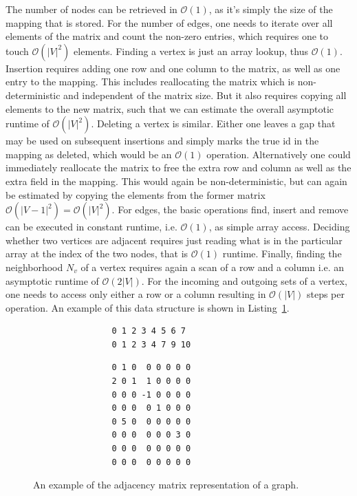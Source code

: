             The number of nodes can be retrieved in $\mathcal{O}(1)$, as it's simply the size of the mapping that is stored.
            For the number of edges, one needs to iterate over all elements of the matrix and count the non-zero entries, which requires one to touch $\mathcal{O}(|V|^2)$ elements.
            Finding a vertex is just an array lookup, thus $\mathcal{O}(1)$.
            Insertion requires adding one row and one column to the matrix, as well as one entry to the mapping. 
            This includes reallocating the matrix which is non-deterministic and independent of the matrix size. But it also requires copying all elements to the new matrix, such that we can estimate the overall asymptotic runtime of $\mathcal{O}(|V|^2)$.
            Deleting a vertex is similar. Either one leaves a gap that may be used on subsequent insertions and simply marks the true id in the mapping as deleted, which would be an $\mathcal{O}(1)$ operation. 
            Alternatively one could immediately reallocate the matrix to free the extra row and column as well as the extra field in the mapping. 
            This would again be non-deterministic, but can again be estimated by copying the elements from the former matrix $\mathcal{O}(|V-1|^2) = \mathcal{O}(|V|^2)$.
            For edges, the basic operations find, insert and remove can be executed in constant runtime, i.e. $\mathcal{O}(1)$, as simple array access.
            Deciding whether two vertices are adjacent requires just reading what is in the particular array at the index of the two nodes, that is $\mathcal{O}(1)$ runtime.
            Finally, finding the neighborhood $N_v$ of a vertex requires again a scan of a row and a column i.e. an asymptotic runtime of $\mathcal{O}(2|V|)$. For the incoming and outgoing sets of a vertex, one needs to access only either a row or a column resulting in $\mathcal{O}(|V|)$ steps per operation.
            An example of this data structure is shown in Listing~\ref{adm}.
            
            \begin{figure}[htp]
            \begin{center}
            \begin{verbatim}
                0 1 2 3 4 5 6 7
                0 1 2 3 4 7 9 10
            \end{verbatim}
            \begin{verbatim}
                0 1 0  0 0 0 0 0
                2 0 1  1 0 0 0 0
                0 0 0 -1 0 0 0 0
                0 0 0  0 1 0 0 0
                0 5 0  0 0 0 0 0
                0 0 0  0 0 0 3 0
                0 0 0  0 0 0 0 0
                0 0 0  0 0 0 0 0
            \end{verbatim}
            \end{center}
            \caption{An example of the adjacency matrix representation of a graph.}
            \label{adm}
            \end{figure}
        

